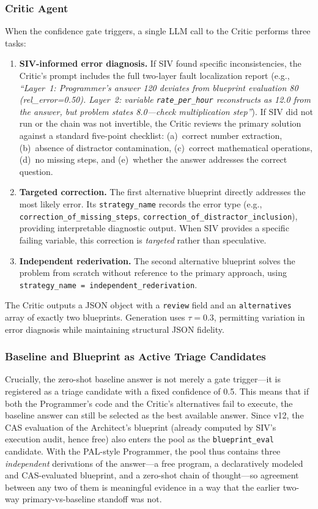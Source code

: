 \documentclass[11pt,a4paper]{article}
\begin{document}
\subsubsection{Critic Agent}
When the confidence gate triggers, a single LLM call to the Critic performs three tasks:
\begin{enumerate}[leftmargin=*,itemsep=2pt]
    \item \textbf{SIV-informed error diagnosis.} If SIV found specific inconsistencies, the Critic's prompt includes the full two-layer fault localization report (e.g., \emph{``Layer~1: Programmer's answer 120 deviates from blueprint evaluation 80 (rel\_error=0.50). Layer~2: variable \texttt{rate\_per\_hour} reconstructs as 12.0 from the answer, but problem states 8.0---check multiplication step''}). If SIV did not run or the chain was not invertible, the Critic reviews the primary solution against a standard five-point checklist: (a)~correct number extraction, (b)~absence of distractor contamination, (c)~correct mathematical operations, (d)~no missing steps, and (e)~whether the answer addresses the correct question.
    \item \textbf{Targeted correction.} The first alternative blueprint directly addresses the most likely error. Its \texttt{strategy\_name} records the error type (e.g., \texttt{correction\_of\_missing\_steps}, \texttt{correction\_of\_distractor\_inclusion}), providing interpretable diagnostic output. When SIV provides a specific failing variable, this correction is \emph{targeted} rather than speculative.
    \item \textbf{Independent rederivation.} The second alternative blueprint solves the problem from scratch without reference to the primary approach, using \texttt{strategy\_name = independent\_rederivation}.
\end{enumerate}
The Critic outputs a JSON object with a \texttt{review} field and an \texttt{alternatives} array of exactly two blueprints.
Generation uses $\tau=0.3$, permitting variation in error diagnosis while maintaining structural JSON fidelity.
\subsubsection{Baseline and Blueprint as Active Triage Candidates}
Crucially, the zero-shot baseline answer is not merely a gate trigger---it is registered as a triage candidate with a fixed confidence of 0.5.
This means that if both the Programmer's code and the Critic's alternatives fail to execute, the baseline answer can still be selected as the best available answer.
Since v12, the CAS evaluation of the Architect's blueprint (already computed by SIV's execution audit, hence free) also enters the pool as the \texttt{blueprint\_eval} candidate.
With the PAL-style Programmer, the pool thus contains three \emph{independent} derivations of the answer---a free program, a declaratively modeled and CAS-evaluated blueprint, and a zero-shot chain of thought---so agreement between any two of them is meaningful evidence in a way that the earlier two-way primary-vs-baseline standoff was not.
\end{document}
